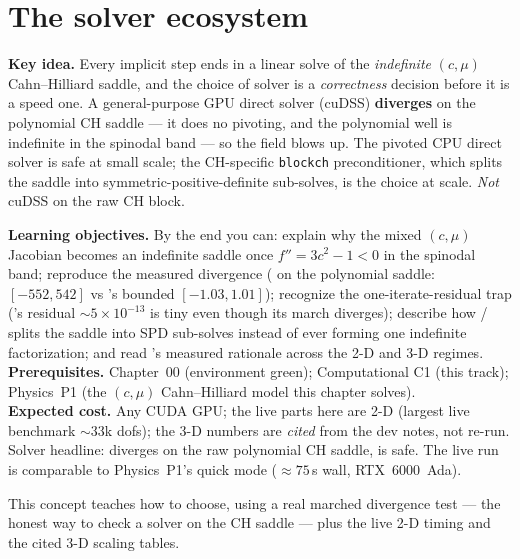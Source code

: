 \chapter{The solver ecosystem}
\label{ch:c4}
\begin{keybox}
\textbf{Key idea.} Every implicit step ends in a linear solve of the
\emph{indefinite} $(c,\mu)$ Cahn--Hilliard saddle, and the choice of
solver is a \emph{correctness} decision before it is a speed one. A
general-purpose GPU direct solver (cuDSS) \textbf{diverges} on the
polynomial CH saddle --- it does no pivoting, and the polynomial well is
indefinite in the spinodal band --- so the field blows up. The pivoted CPU
direct solver  is safe at small scale; the CH-specific
\texttt{blockch} preconditioner, which splits the saddle into
symmetric-positive-definite sub-solves, is the choice at scale. \emph{Not}
cuDSS on the raw CH block.
\end{keybox}

\begin{keybox}
\textbf{Learning objectives.} By the end you can: explain why the mixed
$(c,\mu)$ Jacobian becomes an indefinite saddle once $f''=3c^2-1<0$ in the
spinodal band; reproduce the measured divergence ( on the
polynomial saddle: $[-552,542]$ vs 's bounded $[-1.03,1.01]$);
recognize the one-iterate-residual trap ('s residual
$\sim5\times10^{-13}$ is tiny even though its march diverges); describe how
/ splits the saddle into SPD sub-solves
instead of ever forming one indefinite factorization; and read
's measured rationale across the 2-D and 3-D
regimes.\\[2pt]
\textbf{Prerequisites.} Chapter~00 (environment green); Computational C1
(this track); Physics~P1 (the $(c,\mu)$ Cahn--Hilliard model this chapter
solves).\\[2pt]
\textbf{Expected cost.} Any CUDA GPU; the live parts here are 2-D (largest
live benchmark $\sim33$k dofs); the 3-D numbers are \emph{cited} from the
dev notes, not re-run. Solver headline:  diverges on the raw
polynomial CH saddle,  is safe. The live run is comparable to
Physics~P1's quick mode ($\approx75$\,s wall, RTX~6000~Ada).
\end{keybox}

This concept teaches how to choose, using a real marched divergence test
--- the honest way to check a solver on the CH saddle --- plus the live
2-D timing and the cited 3-D scaling tables.

